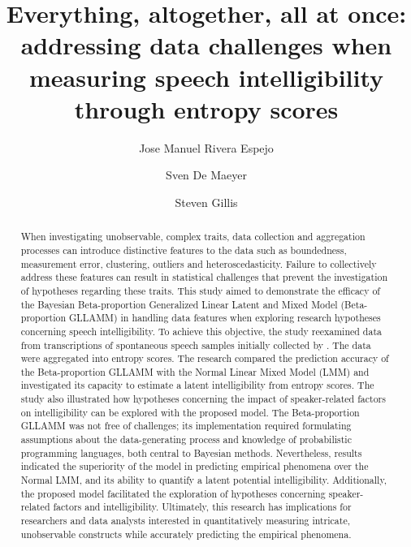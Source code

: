 \documentclass[
  authoryear,
  preprint,
  1p]{elsarticle}
\begin{document}
\begin{frontmatter}
\title{Everything, altogether, all at once: addressing data challenges
when measuring speech intelligibility through entropy scores}
\author[1]{Jose Manuel Rivera Espejo%
%
}
\author[1]{Sven De Maeyer%
%
}
\author[2]{Steven Gillis%
%
}





        
\begin{abstract}
When investigating unobservable, complex traits, data collection and
aggregation processes can introduce distinctive features to the data
such as boundedness, measurement error, clustering, outliers and
heteroscedasticity. Failure to collectively address these features can
result in statistical challenges that prevent the investigation of
hypotheses regarding these traits. This study aimed to demonstrate the
efficacy of the Bayesian Beta-proportion Generalized Linear Latent and
Mixed Model (Beta-proportion GLLAMM)
\citep{Rabe_et_al_2004a, Rabe_et_al_2004b, Rabe_et_al_2004c, Skrondal_et_al_2004a}
in handling data features when exploring research hypotheses concerning
speech intelligibility. To achieve this objective, the study reexamined
data from transcriptions of spontaneous speech samples initially
collected by \citet{Boonen_et_al_2023}. The data were aggregated into
entropy scores. The research compared the prediction accuracy of the
Beta-proportion GLLAMM with the Normal Linear Mixed Model (LMM)
\citep{Holmes_et_al_2019} and investigated its capacity to estimate a
latent intelligibility from entropy scores. The study also illustrated
how hypotheses concerning the impact of speaker-related factors on
intelligibility can be explored with the proposed model. The
Beta-proportion GLLAMM was not free of challenges; its implementation
required formulating assumptions about the data-generating process and
knowledge of probabilistic programming languages, both central to
Bayesian methods. Nevertheless, results indicated the superiority of the
model in predicting empirical phenomena over the Normal LMM, and its
ability to quantify a latent potential intelligibility. Additionally,
the proposed model facilitated the exploration of hypotheses concerning
speaker-related factors and intelligibility. Ultimately, this research
has implications for researchers and data analysts interested in
quantitatively measuring intricate, unobservable constructs while
accurately predicting the empirical phenomena.
\end{abstract}






\end{frontmatter}
\end{document}
